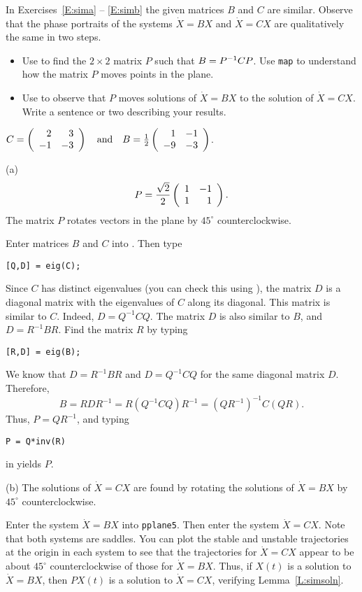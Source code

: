 \documentclass{ximera}
\begin{document}
\noindent In Exercises~\ref{E:sima} -- \ref{E:simb} the given matrices $B$
and $C$ are similar.  Observe that the phase portraits of the systems
$\dot{X}=BX$ and $\dot{X}=CX$ are qualitatively the same in two steps.
\begin{itemize}
\item[(a)]  Use \Matlab to find the $2\times 2$ matrix $P$ such that
$B=P^{-1} CP$.  Use {\tt map} to understand how the matrix $P$ moves points 
in the plane.
\item[(b)]  Use {\pplane} to observe that $P$ moves solutions of
$\dot{X}=BX$ to the solution of $\dot{X}=CX$.  Write a sentence or two describing your results.
\end{itemize}
\begin{exercise} \label{E:sima}
$C = \left(\begin{array}{rr} 2 & 3\\ -1 &-3\end{array}\right) \quad\mbox{and}\quad B = \frac{1}{2}\left(\begin{array}{rr} 1 & -1\\ -9 &-3\end{array}\right)$.

\begin{solution}

(a) \ans
\[
P = \frac{\sqrt{2}}{2}\left(\begin{array}{rr} 1 & -1\\ 1 &1\end{array}\right).
\]
The matrix $P$ rotates vectors in the plane by $45^\circ$ counterclockwise.

\soln Enter matrices $B$ and $C$ into \Matlabp.  Then type
\begin{verbatim}
[Q,D] = eig(C);
\end{verbatim}
Since $C$ has distinct eigenvalues (you can check this using
\Matlabp), the matrix $D$ is a diagonal matrix with the eigenvalues of
$C$ along its diagonal.  This matrix is similar to $C$.  Indeed, $D =
Q^{-1}CQ$.  The matrix $D$ is also similar to $B$, and $D= R^{-1}BR$.
Find the matrix $R$ by typing
\begin{verbatim}
[R,D] = eig(B);
\end{verbatim}
We know that $D = R^{-1}BR$ and $D = Q^{-1}CQ$ for the same diagonal
matrix $D$.  Therefore,
\[
B = RDR^{-1} = R(Q^{-1}CQ)R^{-1} = (QR^{-1})^{-1}C(QR).
\]
Thus, $P = QR^{-1}$, and typing
\begin{verbatim}
P = Q*inv(R)
\end{verbatim}
in \Matlab yields $P$.

(b) \ans The solutions of $\dot{X} = CX$ are found by rotating the
solutions of $\dot{X} = BX$ by $45^\circ$ counterclockwise.

\soln Enter the system $\dot{X} = BX$ into {\tt pplane5}.  Then enter the
system $\dot{X} = CX$.  Note that both systems are saddles.  You can
plot the stable and unstable trajectories at the origin in each system
to see that the trajectories for $\dot{X} = CX$ appear to be about
$45^\circ$ counterclockwise of those for $\dot{X} = BX$.  Thus, if
$X(t)$ is a solution to $\dot{X} = BX$, then $PX(t)$ is a solution to
$\dot{X} = CX$, verifying Lemma~\ref{L:simsoln}.

\end{solution}

\end{exercise}
\end{document}
